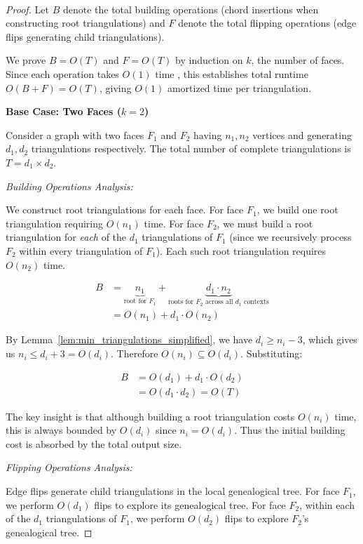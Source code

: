 ﻿﻿\documentclass[12pt,a4paper]{article}
\theoremstyle{definition}
\theoremstyle{remark}
\begin{document}
\begin{proof}
	Let $B$ denote the total building operations (chord insertions when constructing root triangulations) and $F$ denote the total flipping operations (edge flips generating child triangulations).

	We prove $B = O(T)$ and $F = O(T)$ by induction on $k$, the number of faces. Since each operation takes $O(1)$ time , this establishes total runtime $O(B + F) = O(T)$, giving $O(1)$ amortized time per triangulation.

	\noindent\textbf{Base Case: Two Faces ($k = 2$)}

	Consider a graph with two faces $F_1$ and $F_2$ having $n_1, n_2$ vertices and generating $d_1, d_2$ triangulations respectively. The total number of complete triangulations is $T = d_1 \times d_2$.

	\textit{Building Operations Analysis:}

	We construct root triangulations for each face. For face $F_1$, we build one root triangulation requiring $O(n_1)$ time. For face $F_2$, we must build a root triangulation for \textit{each} of the $d_1$ triangulations of $F_1$ (since we recursively process $F_2$ within every triangulation of $F_1$). Each such root triangulation requires $O(n_2)$ time.

	\begin{align*}
		B & = \underbrace{n_1}_{\text{root for } F_1} + \underbrace{d_1 \cdot n_2}_{\text{roots for } F_2 \text{ across all } d_1 \text{ contexts}} \\
		  & = O(n_1) + d_1 \cdot O(n_2)
	\end{align*}

	By Lemma~\ref{lem:min_triangulations_simplified}, we have $d_i \geq n_i - 3$, which gives us $n_i \leq d_i + 3 = O(d_i)$. Therefore $O(n_i) \subseteq O(d_i)$. Substituting:

	\begin{align*}
		B & = O(d_1) + d_1 \cdot O(d_2) \\
		  & = O(d_1 \cdot d_2) = O(T)
	\end{align*}

	The key insight is that although building a root triangulation costs $O(n_i)$ time, this is always bounded by $O(d_i)$ since $n_i = O(d_i)$. Thus the initial building cost is absorbed by the total output size.

	\textit{Flipping Operations Analysis:}

	Edge flips generate child triangulations in the local genealogical tree. For face $F_1$, we perform $O(d_1)$ flips to explore its genealogical tree. For face $F_2$, within each of the $d_1$ triangulations of $F_1$, we perform $O(d_2)$ flips to explore $F_2$'s genealogical tree.


\end{proof}
\end{document}
